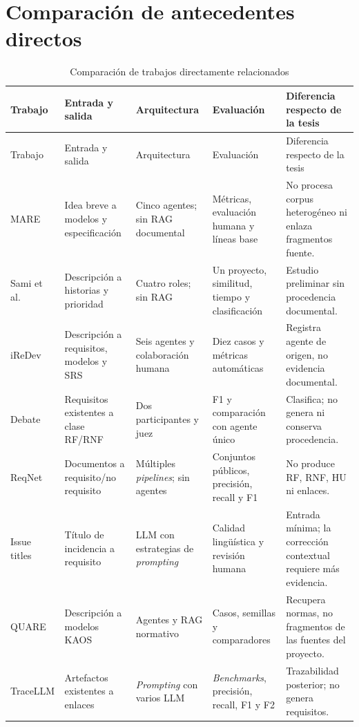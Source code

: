 \section{Comparación de antecedentes directos}

\begin{landscape}
\begin{longtable}{p{2.7cm}p{3.6cm}p{3.7cm}p{4.0cm}p{4.3cm}}
  \caption{Comparación de trabajos directamente relacionados}
  \label{tab:comparacion-antecedentes}\\
  \toprule
  Trabajo & Entrada y salida & Arquitectura & Evaluación & Diferencia respecto de la tesis \\
  \midrule
  \endfirsthead
  \toprule
  Trabajo & Entrada y salida & Arquitectura & Evaluación & Diferencia respecto de la tesis \\
  \midrule
  \endhead
  MARE \cite{mare2024} & Idea breve a modelos y especificación & Cinco agentes; sin RAG documental & Métricas, evaluación humana y líneas base & No procesa corpus heterogéneo ni enlaza fragmentos fuente. \\
  Sami et al.\ \cite{sami2024} & Descripción a historias y prioridad & Cuatro roles; sin RAG & Un proyecto, similitud, tiempo y clasificación & Estudio preliminar sin procedencia documental. \\
  iReDev \cite{iredev2025} & Descripción a requisitos, modelos y SRS & Seis agentes y colaboración humana & Diez casos y métricas automáticas & Registra agente de origen, no evidencia documental. \\
  Debate \cite{oriol2025} & Requisitos existentes a clase RF/RNF & Dos participantes y juez & F1 y comparación con agente único & Clasifica; no genera ni conserva procedencia. \\
  ReqNet \cite{reqnet2026} & Documentos a requisito/no requisito & Múltiples \emph{pipelines}; sin agentes & Conjuntos públicos, precisión, recall y F1 & No produce RF, RNF, HU ni enlaces. \\
  Issue titles \cite{paiva2026} & Título de incidencia a requisito & LLM con estrategias de \emph{prompting} & Calidad lingüística y revisión humana & Entrada mínima; la corrección contextual requiere más evidencia. \\
  QUARE \cite{quare2026} & Descripción a modelos KAOS & Agentes y RAG normativo & Casos, semillas y comparadores & Recupera normas, no fragmentos de las fuentes del proyecto. \\
  TraceLLM \cite{tracellm2026} & Artefactos existentes a enlaces & \emph{Prompting} con varios LLM & \emph{Benchmarks}, precisión, recall, F1 y F2 & Trazabilidad posterior; no genera requisitos. \\
  \bottomrule
\end{longtable}
\end{landscape}

